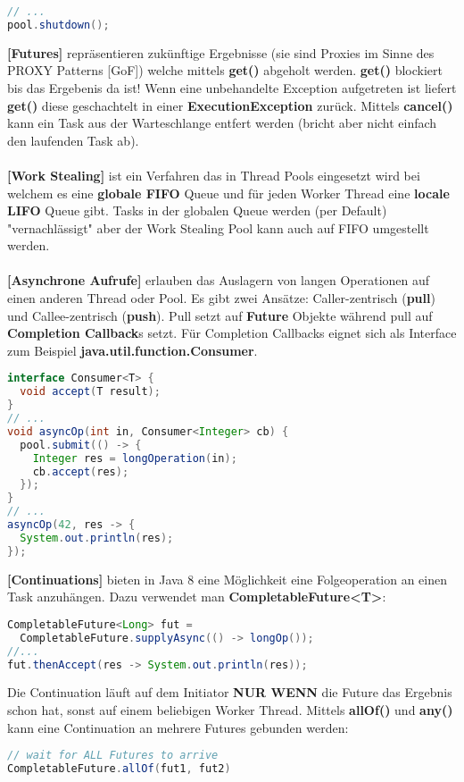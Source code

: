 \documentclass[8pt]{extarticle}
\let\oldtextbf\textbf
\renewcommand{\textbf}{\tiny\oldtextbf}
\begin{document}
\begin{multicols*}{5}
\begin{lstlisting}[language=java]
// ...
pool.shutdown();
\end{lstlisting}
\textbf{[Futures]} repräsentieren zukünftige Ergebnisse (sie sind Proxies im Sinne des PROXY Patterns [GoF]) welche mittels \textbf{get()} abgeholt werden. \textbf{get()} blockiert bis das Ergebenis da ist! Wenn eine unbehandelte Exception aufgetreten ist liefert \textbf{get()} diese geschachtelt in einer \textbf{ExecutionException} zurück. Mittels \textbf{cancel()} kann ein Task aus der Warteschlange entfert werden (bricht aber nicht einfach den laufenden Task ab).\\\\
\textbf{[Work Stealing]} ist ein Verfahren das in Thread Pools eingesetzt wird bei welchem es eine \textbf{globale FIFO} Queue und für jeden Worker Thread eine \textbf{locale LIFO} Queue gibt. Tasks in der globalen Queue werden (per Default) "vernachlässigt" aber der Work Stealing Pool kann auch auf FIFO umgestellt werden.\\\\
\textbf{[Asynchrone Aufrufe]} erlauben das Auslagern von langen Operationen auf einen anderen Thread oder Pool. Es gibt zwei Ansätze: Caller-zentrisch (\textbf{pull}) und Callee-zentrisch (\textbf{push}). Pull setzt auf \textbf{Future} Objekte während pull auf \textbf{Completion Callback}s setzt. Für Completion Callbacks eignet sich als Interface zum Beispiel \textbf{java.util.function.Consumer}.
\begin{lstlisting}[language=java]
interface Consumer<T> {
  void accept(T result);
}
// ...
void asyncOp(int in, Consumer<Integer> cb) {
  pool.submit(() -> {
    Integer res = longOperation(in);
    cb.accept(res);
  });
}
// ...
asyncOp(42, res -> {
  System.out.println(res);
});
\end{lstlisting}
\textbf{[Continuations]} bieten in Java 8 eine Möglichkeit eine Folgeoperation an einen Task anzuhängen. Dazu verwendet man \textbf{CompletableFuture<T>}:
\begin{lstlisting}[language=java]
CompletableFuture<Long> fut = 
  CompletableFuture.supplyAsync(() -> longOp());
//...
fut.thenAccept(res -> System.out.println(res));
\end{lstlisting}
Die Continuation läuft auf dem Initiator \textbf{NUR WENN} die Future das Ergebnis schon hat, sonst auf einem beliebigen Worker Thread. Mittels \textbf{allOf()} und \textbf{any()} kann eine Continuation an mehrere Futures gebunden werden:
\begin{lstlisting}[language=java]
// wait for ALL Futures to arrive
CompletableFuture.allOf(fut1, fut2)

\end{lstlisting}
\end{multicols*}
\end{document}
